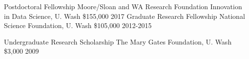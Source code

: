 

\begin{cvhonors}

  \cvhonor
    {Postdoctoral Fellowship} %
    {Moore/Sloan and WA Research Foundation Innovation in Data Science, U. Wash} %
    {\$155,000} %
    {2017} %
  \cvhonor
    {Graduate Research Fellowship} %
    {National Science Foundation, U. Wash} %
    {\$105,000} %
    {2012-2015} %

  \cvhonor
    {Undergraduate Research Scholarship} %
    {The Mary Gates Foundation, U. Wash} %
    {\$3,000} %
    {2009} %


\end{cvhonors}







